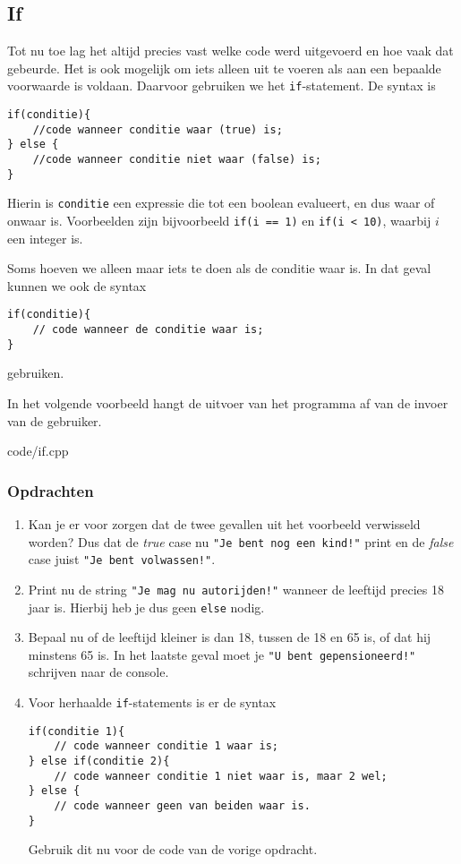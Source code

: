 \documentclass[12pt,a4paper]{article}
\newcommand{\code}{}
\newcommand{\icode}{\lstinline}
\begin{document}
\subsection{If}
Tot nu toe lag het altijd precies vast welke code werd uitgevoerd en hoe vaak dat gebeurde. Het is ook mogelijk om iets alleen uit te voeren als aan een bepaalde voorwaarde is voldaan. Daarvoor gebruiken we het \icode{if}-statement. De syntax is
\begin{lstlisting}
if(conditie){
	//code wanneer conditie waar (true) is;
} else {
	//code wanneer conditie niet waar (false) is;
}
\end{lstlisting}
Hierin is \icode{conditie} een expressie die tot een boolean evalueert, en dus waar of onwaar is. Voorbeelden zijn bijvoorbeeld \icode{if(i == 1)} en \icode{if(i < 10)}, waarbij $i$ een integer is. 

Soms hoeven we alleen maar iets te doen als de conditie waar is. In dat geval kunnen we ook de syntax
\begin{lstlisting}
if(conditie){
	// code wanneer de conditie waar is;
}
\end{lstlisting}
gebruiken.

In het volgende voorbeeld hangt de uitvoer van het programma af van de invoer van de gebruiker.

\code{code/if.cpp}

\subsubsection{Opdrachten}
\begin{enumerate}
		\item
		Kan je er voor zorgen dat de twee gevallen uit het voorbeeld verwisseld worden? Dus dat de \emph{true} case nu \icode{"Je bent nog een kind!"} print en de \emph{false} case juist \icode{"Je bent volwassen!"}.
		\item
			Print nu de string \icode{"Je mag nu autorijden!"} wanneer de leeftijd precies 18 jaar is. Hierbij heb je dus geen \icode{else} nodig.
		\item
			Bepaal nu of de leeftijd kleiner is dan 18, tussen de 18 en 65 is, of dat hij minstens 65 is. In het laatste geval moet je \icode{"U bent gepensioneerd!"} schrijven naar de console.
		\item
			Voor herhaalde \icode{if}-statements is er de syntax
\begin{lstlisting}
if(conditie 1){
	// code wanneer conditie 1 waar is;
} else if(conditie 2){
	// code wanneer conditie 1 niet waar is, maar 2 wel;
} else {
	// code wanneer geen van beiden waar is.
}
\end{lstlisting}
Gebruik dit nu voor de code van de vorige opdracht.
\end{enumerate}
\end{document}
